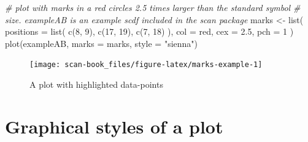 \documentclass[
]{book}
\newenvironment{Shaded}{\begin{snugshade}}{\end{snugshade}}
\newcommand{\AttributeTok}[1]{\textcolor[rgb]{0.77,0.63,0.00}{#1}}
\newcommand{\CommentTok}[1]{\textcolor[rgb]{0.56,0.35,0.01}{\textit{#1}}}
\newcommand{\DecValTok}[1]{\textcolor[rgb]{0.00,0.00,0.81}{#1}}
\newcommand{\FloatTok}[1]{\textcolor[rgb]{0.00,0.00,0.81}{#1}}
\newcommand{\FunctionTok}[1]{\textcolor[rgb]{0.00,0.00,0.00}{#1}}
\newcommand{\NormalTok}[1]{#1}
\newcommand{\OtherTok}[1]{\textcolor[rgb]{0.56,0.35,0.01}{#1}}
\newcommand{\StringTok}[1]{\textcolor[rgb]{0.31,0.60,0.02}{#1}}
\begin{document}
\begin{Shaded}
\begin{Highlighting}[]
\CommentTok{\# plot with marks in a red circles 2.5 times larger than the standard symbol }
\CommentTok{\# size. exampleAB is an example scdf included in the scan package}
\NormalTok{marks }\OtherTok{\textless{}{-}} \FunctionTok{list}\NormalTok{(}
  \AttributeTok{positions =} \FunctionTok{list}\NormalTok{( }\FunctionTok{c}\NormalTok{(}\DecValTok{8}\NormalTok{, }\DecValTok{9}\NormalTok{), }\FunctionTok{c}\NormalTok{(}\DecValTok{17}\NormalTok{, }\DecValTok{19}\NormalTok{), }\FunctionTok{c}\NormalTok{(}\DecValTok{7}\NormalTok{, }\DecValTok{18}\NormalTok{) ), }
  \AttributeTok{col =} \StringTok{\textquotesingle{}red\textquotesingle{}}\NormalTok{, }\AttributeTok{cex =} \FloatTok{2.5}\NormalTok{, }\AttributeTok{pch =} \DecValTok{1}
\NormalTok{)}
\FunctionTok{plot}\NormalTok{(exampleAB, }\AttributeTok{marks =}\NormalTok{ marks, }\AttributeTok{style =} \StringTok{"sienna"}\NormalTok{)}
\end{Highlighting}
\end{Shaded}

\begin{figure}

{\centering \texttt{[image: scan-book\_files/figure-latex/marks-example-1]} 

}

\caption{A plot with highlighted data-points}\label{fig:marks-example}
\end{figure}

\hypertarget{graphical-styles-of-a-plot}{%
\section{Graphical styles of a plot}\label{graphical-styles-of-a-plot}}
\end{document}
